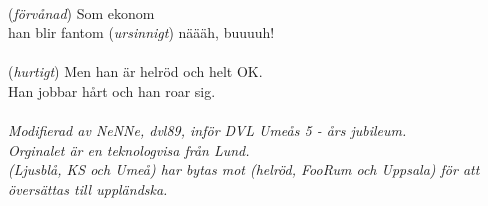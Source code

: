 \\
(\textit{förvånad}) Som ekonom\\
han blir fantom (\textit{ursinnigt}) näääh, buuuuh!\\
\\
(\textit{hurtigt}) \revrpt Men han är helröd och helt OK.\\
Han jobbar hårt och han roar sig.\rpt\\
\\
{\footnotesize\textit{Modifierad av NeNNe, dvl89, inför
    DVL Umeås 5 - års jubileum.\\ Orginalet är en
    teknologvisa från Lund.\\ (Ljusblå, KS och Umeå) har bytas mot
    (helröd, FooRum och Uppsala) för att översättas till uppländska.}}
